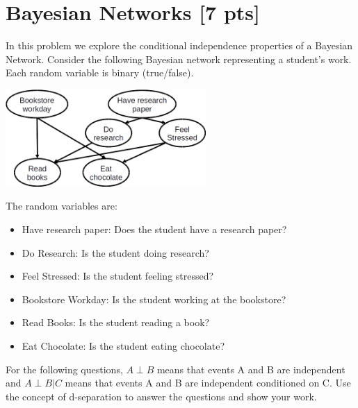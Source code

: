 \documentclass[submit]{harvardml}
\newcommand{\attr}[1]{\textsf{#1}}
\begin{document}
\section*{Bayesian Networks [7 pts]}
\begin{problem}


  \noindent In this problem we explore the conditional independence
  properties of a Bayesian Network.  Consider the following Bayesian
  network representing a student's work. Each random variable is
  binary (true/false).
\begin{center}
\includegraphics[width=3in]{bn.png}
\end{center}

The random variables are:
%
\begin{itemize}
\item \attr{Have research paper}: Does the student have a research paper?
\item \attr{Do Research}: Is the student doing research?
\item \attr{Feel Stressed}: Is the student feeling stressed?
\item \attr{Bookstore Workday}: Is the student working at the bookstore?
\item \attr{Read Books}: Is the student reading a book?
\item \attr{Eat Chocolate}: Is the student eating chocolate?
\end{itemize}

\medskip

For the following questions, $A \perp B$ means that events A and B are
independent and $A \perp B | C$ means that events A and B are independent
conditioned on C. Use the concept of d-separation to answer the
questions and show your work.


\end{problem}
\end{document}

